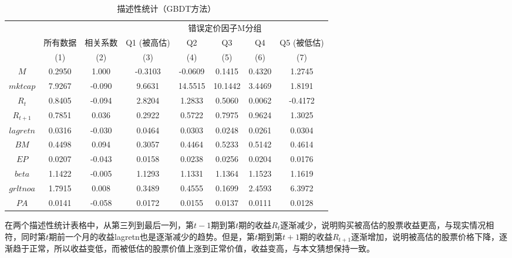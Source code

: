 {\begin{table}[htbp]\centering
\def\sym#1{\ifmmode^{#1}\else\(^{#1}\)\fi}
\caption{描述性统计（GBDT方法）}
\label{description2}
\begin{tabular*}{\hsize}{@{\hskip\tabcolsep\extracolsep\fill}*{8}{c}}
\toprule
               &\multicolumn{1}{c}{}&\multicolumn{1}{c}{}&\multicolumn{5}{c}{错误定价因子M分组}\\\cline{4-8} 
          &\multicolumn{1}{c}{所有数据}&\multicolumn{1}{c}{相关系数}&\multicolumn{1}{c}{Q1 (被高估)}&\multicolumn{1}{c}{Q2}&\multicolumn{1}{c}{Q3}&\multicolumn{1}{c}{Q4}&\multicolumn{1}{c}{Q5 (被低估)}\\
          &\multicolumn{1}{c}{(1)}&\multicolumn{1}{c}{(2)}&\multicolumn{1}{c}{(3)}&\multicolumn{1}{c}{(4)}&\multicolumn{1}{c}{(5)}&\multicolumn{1}{c}{(6)}&\multicolumn{1}{c}{(7)}\\
\midrule
$M$       &    0.2950& 1.000& -0.3103&  -0.0609&   0.1415&   0.4320&   1.2745\\
$mktcap $  & 7.9267 &  -0.090&  9.6631&  14.5515&  10.1442&   3.4469&   1.8191\\
$R_{t}$   &    0.8405& -0.094&   2.8204&   1.2833&   0.5060&   0.0062&  -0.4172\\
$R_{t+1}$ &   0.7851&  0.036&  0.2922&   0.5722&   0.7975&   0.9624&   1.3025\\
$lagretn $  & 0.0316&   -0.030&   0.0464&   0.0303&   0.0248&   0.0261&   0.0304\\
$BM$    &   0.4498&    0.094&   0.3057&   0.4464&   0.5233&   0.5142&   0.4614\\
$EP  $      &  0.0207 &   -0.043&   0.0158&   0.0238&   0.0256&   0.0204&   0.0176\\
$beta$     &  1.1422&   -0.005&   1.1293&   1.1331&   1.1364&   1.1523&   1.1619\\
$grltnoa$ &   1.7915&    0.008&   0.3489&   0.4555&   0.1699&   2.4593&   6.3972\\
$PA$        & 0.0141&   -0.058&   0.0172&   0.0155&   0.0137&   0.0111&   0.0128\\
\bottomrule
\end{tabular*}
\end{table}
}

在两个描述性统计表格中，从第三列到最后一列，第$t-1$期到第$t$期的收益$R_t$逐渐减少，说明购买被高估的股票收益更高，与现实情况相符，同时第$t$期前一个月的收益lagretn也是逐渐减少的趋势。但是，第$t$期到第$t+1$期的收益$R_{t+1}$逐渐增加，说明被高估的股票价格下降，逐渐趋于正常，所以收益变低，而被低估的股票价值上涨到正常价值，收益变高，与本文猜想保持一致。

